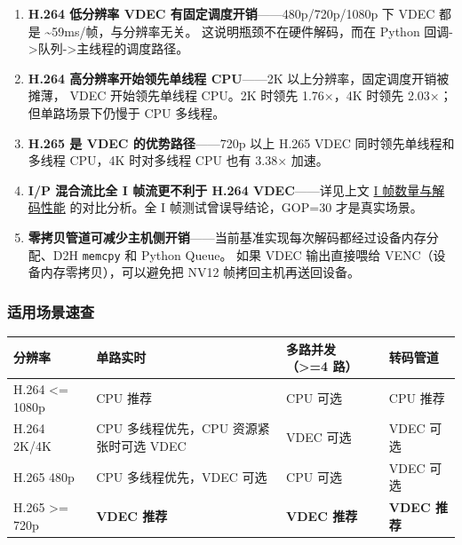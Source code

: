 \begin{enumerate}
\def\labelenumi{\arabic{enumi}.}
\item
  \textbf{H.264 低分辨率 VDEC 有固定调度开销}------480p/720p/1080p 下
  VDEC 都是 \textasciitilde59ms/帧，与分辨率无关。
  这说明瓶颈不在硬件解码，而在 Python
  回调-\textgreater 队列-\textgreater 主线程的调度路径。
\item
  \textbf{H.264 高分辨率开始领先单线程 CPU}------2K
  以上分辨率，固定调度开销被摊薄， VDEC 开始领先单线程 CPU。2K 时领先
  1.76×，4K 时领先 2.03×；但单路场景下仍慢于 CPU 多线程。
\item
  \textbf{H.265 是 VDEC 的优势路径}------720p 以上 H.265 VDEC
  同时领先单线程和多线程 CPU，4K 时对多线程 CPU 也有 3.38× 加速。
\item
  \textbf{I/P 混合流比全 I 帧流更不利于 H.264 VDEC}------详见上文
  \hyperref[iframe-performance]{I 帧数量与解码性能} 的对比分析。全 I
  帧测试曾误导结论，GOP=30 才是真实场景。
\item
  \textbf{零拷贝管道可减少主机侧开销}------当前基准实现每次解码都经过设备内存分配、D2H
  \passthrough{\lstinline!memcpy!} 和 Python Queue。 如果 VDEC
  输出直接喂给 VENC（设备内存零拷贝），可以避免把 NV12
  帧拷回主机再送回设备。
\end{enumerate}

\subsubsection{适用场景速查}\label{src-book-chapter6-h80}

\begin{longtable}[]{@{}
  >{\raggedright\arraybackslash}p{}
  >{\raggedright\arraybackslash}p{}
  >{\raggedright\arraybackslash}p{}
  >{\raggedright\arraybackslash}p{}@{}}
\toprule\noalign{}
\begin{minipage}[b]{\linewidth}\raggedright
分辨率
\end{minipage} & \begin{minipage}[b]{\linewidth}\raggedright
单路实时
\end{minipage} & \begin{minipage}[b]{\linewidth}\raggedright
多路并发（\textgreater=4 路）
\end{minipage} & \begin{minipage}[b]{\linewidth}\raggedright
转码管道
\end{minipage} \\
\midrule\noalign{}
\endhead
\bottomrule\noalign{}
\endlastfoot
H.264 \textless= 1080p & CPU 推荐 & CPU 可选 & CPU 推荐 \\
H.264 2K/4K & CPU 多线程优先，CPU 资源紧张时可选 VDEC & VDEC 可选 & VDEC
可选 \\
H.265 480p & CPU 多线程优先，VDEC 可选 & CPU 可选 & VDEC 可选 \\
H.265 \textgreater= 720p & \textbf{VDEC 推荐} & \textbf{VDEC 推荐} &
\textbf{VDEC 推荐} \\
\end{longtable}

